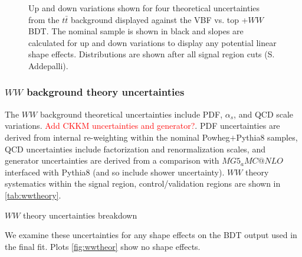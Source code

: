 \begin{figure}[!h]
{  }%
{\caption{Up and down variations shown for four theoretical uncertainties from the $t\bar{t}$ background displayed against the VBF vs. top +$WW$ BDT. The nominal sample is shown in black and slopes are calculated for up and down variations to display any potential linear shape effects. Distributions are shown after all signal region cuts (S. Addepalli).
\label{fig:ttbartheor}}}
\end{figure}

\subsubsection{$WW$ background theory uncertainties}

The $WW$ background theoretical uncertainties include PDF, $\alpha_s$, and QCD scale variations. \textcolor{red}{Add CKKM uncertainties and generator?}. PDF uncertainties are derived from internal re-weighting within the nominal Powheg$+$Pythia8 samples, QCD uncertainties include factorization and renormalization scales, and generator uncertainties are derived from a comparison with $MG5_aMC@NLO$ interfaced with Pythia8 (and so include shower uncertainty). $WW$ theory systematics within the signal region, control/validation regions are shown in \ref{tab:wwtheory}.

\begin{table}[h!]
\scalebox{0.6}{

}
\caption{$WW$ theory uncertainties breakdown}
\label{tab:wwtheory}
\end{table}

We examine these uncertainties for any shape effects on the BDT output used in the final fit. Plots \ref{fig:wwtheor} show no shape effects.

